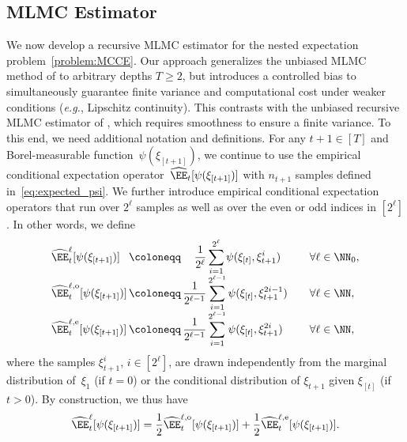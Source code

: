 \documentclass[11pt]{article}
\let\hat\widehat
\begin{document}
\subsection{MLMC Estimator}
\label{sec:rtmlmc}
We now develop a recursive MLMC estimator for the nested expectation problem~\eqref{problem:MCCE}. Our approach generalizes the unbiased MLMC method of \cite{blanchet2015unbiased} to arbitrary depths $T\geq 2$, but introduces a controlled bias to simultaneously guarantee finite variance and computational cost under weaker conditions ({\em e.g.}, Lipschitz continuity). This contrasts with the unbiased recursive MLMC estimator of \cite{syed2023optimal}, which requires smoothness to ensure a finite variance. To this end, we need additional notation and definitions. For any $t+1\in[T]$ and Borel-measurable function~$\psi(\xi_{[t+1]})$, we continue to use the empirical conditional expectation operator~$\hat\EE_t[\psi(\xi_{[t+1]})]$ with $n_{t+1}$ samples defined in~\eqref{eq:expected_psi}. We further introduce empirical conditional expectation operators that run over $2^\ell$ samples as well as over the even or odd indices in $[2^\ell]$. In other words, we define
\begin{align*}
    \begin{array}{l@{\,}c@{\,}r@{\,}l@{\qquad}l}
        \displaystyle \hat\EE_t^{\ell}[\psi(\xi_{[t+1]})] & \coloneqq &\displaystyle \frac{1}{2^\ell} & \displaystyle\sum_{i=1}^{2^\ell} \psi(\xi_{[t]},\xi_{t+1}^{i}) & \forall\ell\in\NN_0,\\
        \hat\EE_t^{\ell,\rm o}[\psi(\xi_{[t+1]})] & \coloneqq &\displaystyle  \frac{1}{2^{\ell-1}} & \displaystyle\sum_{i=1}^{2^{\ell-1}} \psi(\xi_{[t]},\xi_{t+1}^{2i-1}) & \forall\ell\in\NN,\\
        \hat\EE_t^{\ell,\rm e} [\psi(\xi_{[t+1]})] & \coloneqq &\displaystyle  \frac{1}{2^{\ell-1}} & \displaystyle \sum_{i=1}^{2^{\ell-1}} \psi(\xi_{[t]},\xi_{t+1}^{2i}) & \forall\ell\in\NN,
    \end{array}
\end{align*}
where the samples $\xi_{t+1}^{i}$, $i\in[2^\ell]$, are drawn independently from the marginal distribution of~$\xi_1$ (if $t=0$) or the conditional distribution of $\xi_{t+1}$ given $\xi_{[t]}$ (if $t>0$). By construction, we thus have
\begin{align}
    \label{eq:even-odd-averages-identity}
    \hat\EE_t^{\ell}[\psi(\xi_{[t+1]})] =\frac{1}{2}\hat\EE_t^{\ell,{\rm o}}[\psi(\xi_{[t+1]})] + \frac{1}{2} \hat\EE_t^{\ell, {\rm e}}[\psi(\xi_{[t+1]})].
\end{align}
\end{document}
